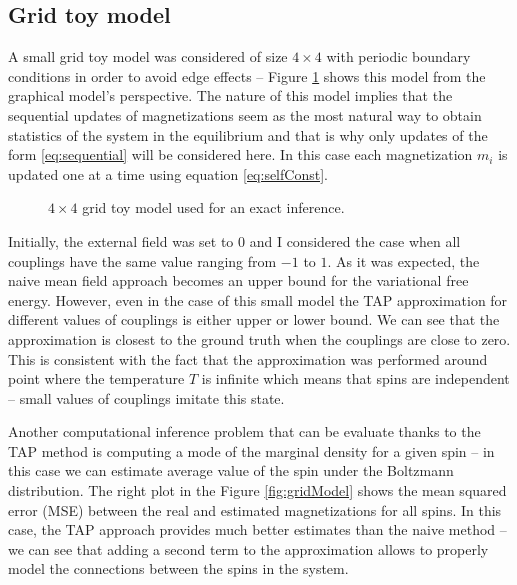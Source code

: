 \subsection{Grid toy model}
A small grid toy model was considered of size $4 \times 4$ with periodic boundary conditions in order to avoid edge effects -- Figure \ref{fig:grid} shows this model from the graphical model's perspective. The nature of this model implies that the sequential updates of magnetizations seem as the most natural way to obtain statistics of the system in the equilibrium and that is why only updates of the form \ref{eq:sequential} will be considered here. In this case each magnetization $m_i$ is updated one at a time using equation \ref{eq:selfConst}.

\begin{figure}[!htb]
\begin{center}

\end{center}
  \caption[Grid toy model]{$4 \times 4$ grid toy model used for an exact inference.}
    \label{fig:grid}
\end{figure}

Initially, the external field was set to $0$ and I considered the case when all couplings have the same value ranging from $-1$ to $1$. As it was expected, the naive mean field approach becomes an upper bound for the variational free energy. However, even in the case of this small model the TAP approximation for different values of couplings is either upper or lower bound. We can see that the approximation is closest to the ground truth when the couplings are close to zero. This is consistent with the fact that the approximation was performed around point where the temperature $T$ is infinite which means that spins are independent -- small values of couplings imitate this state.

Another computational inference problem that can be evaluate thanks to the TAP method is computing a mode of the marginal density for a given spin -- in this case we can estimate average value of the spin under the Boltzmann distribution. The right plot in the Figure \ref{fig:gridModel} shows the mean squared error (MSE) between the real and estimated magnetizations for all spins. In this case, the TAP approach provides much better estimates than the naive method -- we can see that adding a second term to the approximation allows to properly model the connections between the spins in the system. 

